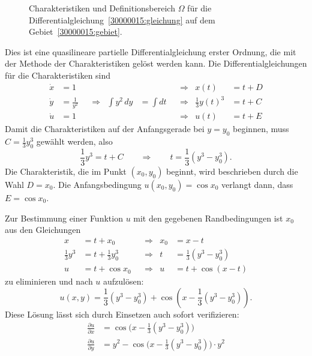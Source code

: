\begin{loesung}
\begin{figure}
\centering
{}
\caption{Charakteristiken und Definitionsbereich $\Omega$
für die Differentialgleichung~\eqref{30000015:gleichung}
auf dem Gebiet~\eqref{30000015:gebiet}.
\label{30000015:domain}
}
\end{figure}
Dies ist eine quasilineare partielle Differentialgleichung erster Ordnung, die
mit der Methode der Charakteristiken gelöst werden kann.
Die Differentialgleichungen für die Charakteristiken sind
\[
\begin{aligned}
\dot x &= 1           &&           &              &         &&\Rightarrow& x(t) &= t + D
\\
\dot y &= \frac1{y^2} &&\Rightarrow& \int y^2\,dy &=\int dt &&\Rightarrow& \frac13 y(t)^3 &= t + C
\\
\dot u &= 1           &&           &              &         &&\Rightarrow& u(t) &= t + E
\end{aligned}
\]
Damit die Charakteristiken auf der Anfangsgerade bei $y=y_0$ beginnen, muss
$C=\frac13y_0^3$ gewählt werden, also
\[
\frac13 y^3 = t + C
\qquad\Rightarrow\qquad
t = \frac13(y^3-y_0^3).
\]
Die Charakteristik, die im Punkt $(x_0,y_0)$ beginnt, wird beschrieben durch
die Wahl $D=x_0$.
Die Anfangsbedingung $u(x_0,y_0)=\cos x_0 $
verlangt dann, dass $E=\cos x_0 $.
\begin{teilaufgaben}
\item Zur Bestimmung einer Funktion $u$ mit den gegebenen Randbedingungen
ist $x_0$ aus den Gleichungen
\[
\begin{aligned}
x           &= t + x_0          &&\Rightarrow& x_0 &= x - t              \\
{\textstyle\frac13}y^3 &= t + {\textstyle\frac13}y_0^3 &&\Rightarrow& t   &= \textstyle{\frac13}(y^3-y_0^3) \\
u           &= t + \cos x_0     &&\Rightarrow& u   &= t + \cos(x-t)
\end{aligned}
\]
zu eliminieren und nach $u$ aufzulösen:
\[
u(x,y) = 
{\textstyle \frac13}(y^3-y_0^3)
+
\cos (x-{\textstyle \frac13}(y^3-y_0^3)).
\]
Diese Lösung lässt sich durch Einsetzen auch sofort verifizieren:
\begin{align*}
\frac{\partial u}{\partial x}
&=
\cos\bigl(x-{\textstyle\frac13}(y^3-y_0^3)\bigr)
\\
\frac{\partial u}{\partial y}
&=
y^2 -
\cos\bigl(x-{\textstyle\frac13}(y^3-y_0^3)\bigr)
\cdot y^2
\\

\end{align*}
\end{teilaufgaben}
\end{loesung}
